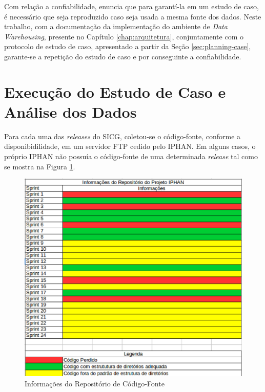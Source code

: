 Com relação a confiabilidade,  enuncia que para garantí-la em um estudo de caso, é necessário que seja reproduzido caso seja usada a mesma fonte dos dados. Neste trabalho, com a documentação da implementação do ambiente de \textit{Data Warehousing}, presente no Capítulo \ref{chap:arquitetura}, conjuntamente com o protocolo de estudo de caso, apresentado a partir da Seção \ref{sec:planning-case}, garante-se a repetição do estudo de caso e por conseguinte a confiabilidade.

\section{Execução do Estudo de Caso e Análise dos Dados}
\label{sec:execution-case-study}

Para cada uma das \textit{releases} do SICG, coletou-se o código-fonte, conforme a disponibidilidade, em um servidor FTP cedido pelo IPHAN. Em alguns casos, o próprio IPHAN não possuía o código-fonte de uma determinada \textit{release} tal como se mostra na Figura \ref{fig:repositorio-IPHAN}.

\begin{figure}[ht!]
\centering
\includegraphics[keepaspectratio=true,scale=0.5]{figuras/repositorio-iphan.eps}
\caption{Informações do Repositório de Código-Fonte}
\label{fig:repositorio-IPHAN}
\end{figure}
\FloatBarrier


